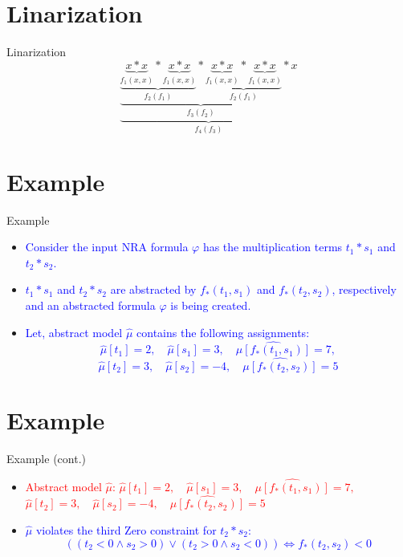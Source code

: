 \documentclass[]{beamer}
\begin{document}
\section{Linarization}
\begin{frame}{Linarization}
    $$\underbrace{ \underbrace{ \underbrace{ \underbrace{ x \ast x }\limits_{f_{1}(x, x)} \ast \underbrace{ x \ast x }\limits_{f_{1}(x, x)}}\limits_{f_{2}(f_{1})} \ast \underbrace{ \underbrace{ x \ast x }\limits_{f_{1}(x, x)} \ast \underbrace{ x \ast x }\limits_{f_{1}(x, x)}}\limits_{f_{2}(f_{1})}}\limits_{f_{3}(f_{2})} \ast x}\limits_{f_{4}(f_{3})}$$
\end{frame}

\section{Example}
\begin{frame}{Example}
    \begin{itemize}
        \item \textcolor<1>{blue}{Consider the input NRA formula $\varphi$ has the multiplication terms $t_{1} \ast s_{1}$ and $t_{2} \ast s_{2}$.}
        \item \textcolor<2>{blue}{$t_{1} \ast s_{1}$ and $t_{2} \ast s_{2}$ are abstracted by $f_{\ast}(t_{1}, s_{1})$ and $f_{\ast}(t_{2}, s_{2})$, respectively and an abstracted formula $\hat{\varphi}$ is being created.}
		\item \textcolor<3>{blue}{Let, abstract model $\hat{\mu}$ contains the following assignments:
    $$\hat{\mu}[t_{1}] = 2, \quad \hat{\mu}[s_{1}] = 3, \quad \hat{\mu[f_{\ast}(t_{1}, s_{1})]} = 7,$$ $$\hat{\mu}[t_{2}] = 3, \quad \hat{\mu}[s_{2}] = -4, \quad \hat{\mu[f_{\ast}(t_{2}, s_{2})]} = 5$$}
    \end{itemize}
\end{frame}

\section{Example}
\begin{frame}{Example (cont.)}
    \begin{itemize}
        \item \textcolor{red}{Abstract model $\hat{\mu}$:  $\hat{\mu}[t_{1}] = 2, \quad \hat{\mu}[s_{1}] = 3, \quad \hat{\mu[f_{\ast}(t_{1}, s_{1})]} = 7,$ $\hat{\mu}[t_{2}] = 3, \quad \hat{\mu}[s_{2}] = -4, \quad \hat{\mu[f_{\ast}(t_{2}, s_{2})]} = 5$}
        \item \textcolor<1>{blue}{$\hat{\mu}$ violates the third Zero constraint for $t_{2} \ast s_{2}$:
    $$((t_{2} < 0 \wedge s_{2} > 0) \vee (t_{2} > 0 \wedge s_{2} < 0)) \Leftrightarrow f_{\ast}(t_{2}, s_{2}) < 0$$}
    \end{itemize}
\end{frame}
\end{document}
